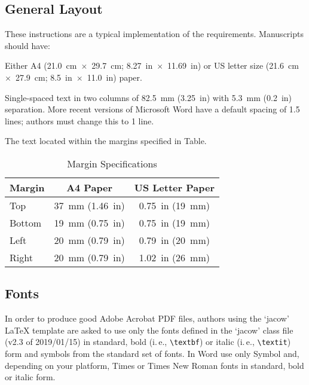 \documentclass[a4paper,
               keeplastbox,   %
               ]{jacow}
\begin{document}
\subsection{General Layout}

These instructions are a typical implementation of the
requirements. Manuscripts should have:
\begin{Itemize}
    \item  Either A4 (\SI{21.0}{cm}~$\times$~\SI{29.7}{cm}; \SI{8.27}{in}~$\times$~\SI{11.69}{in}) or US
           letter size (\SI{21.6}{cm}~$\times$~\SI{27.9}{cm}; \SI{8.5}{in}~$\times$~\SI{11.0}{in}) paper.
    \item  Single-spaced text in two columns of \SI{82.5}{mm} (\SI{3.25}{in}) with \SI{5.3}{mm}
           (\SI{0.2}{in}) separation. More recent versions of Microsoft Word have a default spacing of 1.5 lines;
           authors must change this to 1 line.
    \item  The text located within the margins specified in Table.
\end{Itemize}
\begin{table}[!hbt]
   \centering
   \caption{Margin Specifications}
   \begin{tabular}{lcc}
       \toprule
       \textbf{Margin} & \textbf{A4 Paper}                      & \textbf{US Letter Paper} \\
       \midrule
           Top         & \SI{37}{mm} (\SI{1.46}{in})            & \SI{0.75}{in} (\SI{19}{mm})        \\ %
          Bottom       & \SI{19}{mm} (\SI{0.75}{in})            & \SI{0.75}{in} (\SI{19}{mm})        \\ %
           Left        & \SI{20}{mm} (\SI{0.79}{in})            & \SI{0.79}{in} (\SI{20}{mm})        \\ %
           Right       & \SI{20}{mm} (\SI{0.79}{in})            & \SI{1.02}{in} (\SI{26}{mm})        \\
       \bottomrule
   \end{tabular}
   \label{tab:margins}
\end{table}

\subsection{Fonts}

In order to produce good Adobe Acrobat PDF files, authors
using the `jacow' \LaTeX{} template are asked to use only the fonts
defined in the ‘jacow’ class file (v2.3 of 2019/01/15) in standard, 
bold (i.\,e., \verb|\textbf|) or italic (i.\,e., \verb|\textit|) form and
symbols from the standard set of fonts. In Word use only
Symbol and, depending on your platform, Times or Times New Roman
fonts in standard, bold or italic form.
\end{document}
